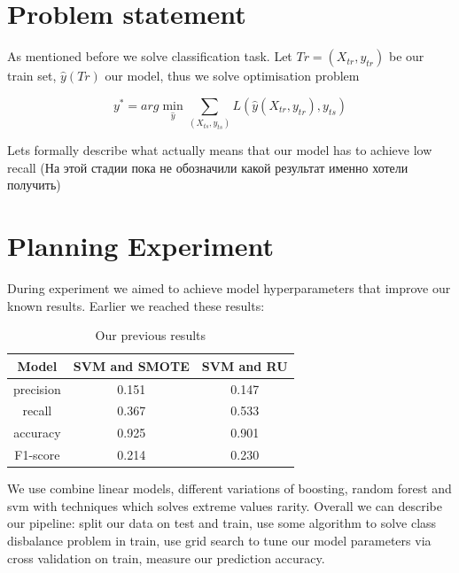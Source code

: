 \documentclass{article}
\begin{document}
\section{Problem statement}
As mentioned before we solve classification task. Let $Tr = (X_{tr}, y_{tr})$ be our train set, $\widehat{y}(Tr)$ our model, thus we solve optimisation problem 

$$y^* = arg \min\limits_{\widehat{y}} \sum \limits _{(X_{ts}, y_{ts})} L(\widehat{y}(X_{tr}, y_{tr}), y_{ts})$$

Lets formally describe what actually means that our model has to achieve low recall (На этой стадии пока не обозначили какой результат именно хотели получить)

\section{Planning Experiment}
During experiment we aimed to achieve model hyperparameters that improve our known results. Earlier we reached these results:

\begin{table}
		\begin{tabular}{|c|c|c|}
			\hline
			Model & SVM and SMOTE & SVM and RU \\ \hline
			precision &  0.151 & 0.147 \\ \hline
			recall & 0.367 & 0.533  \\ \hline
			accuracy & 0.925 & 0.901  \\ \hline
			F1-score &  0.214 & 0.230 \\ \hline
		\end{tabular}
		\caption{Our previous results}
\end{table}We use combine linear models, different variations of boosting, random forest and svm with techniques which solves extreme values rarity. Overall we can describe our pipeline: split our data on test and train, use some algorithm to solve class disbalance problem in train, use grid search to tune our model parameters via cross validation on train, measure our prediction accuracy.
\end{document}
